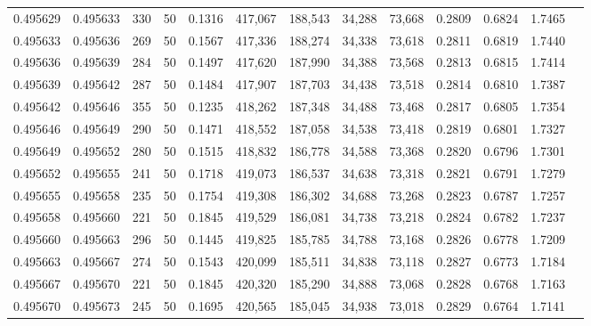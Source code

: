 \begin{tabular}{rrrrrrrrrrrrr}
0.495629 & 0.495633 &   330 &  50 &                                     0.1316 & 417,067 & 188,543 &  34,288 &  73,668 & 0.2809 & 0.6824 & 1.7465 \\
0.495633 & 0.495636 &   269 &  50 &                                     0.1567 & 417,336 & 188,274 &  34,338 &  73,618 & 0.2811 & 0.6819 & 1.7440 \\
0.495636 & 0.495639 &   284 &  50 &                                     0.1497 & 417,620 & 187,990 &  34,388 &  73,568 & 0.2813 & 0.6815 & 1.7414 \\
0.495639 & 0.495642 &   287 &  50 &                                     0.1484 & 417,907 & 187,703 &  34,438 &  73,518 & 0.2814 & 0.6810 & 1.7387 \\
0.495642 & 0.495646 &   355 &  50 &                                     0.1235 & 418,262 & 187,348 &  34,488 &  73,468 & 0.2817 & 0.6805 & 1.7354 \\
0.495646 & 0.495649 &   290 &  50 &                                     0.1471 & 418,552 & 187,058 &  34,538 &  73,418 & 0.2819 & 0.6801 & 1.7327 \\
0.495649 & 0.495652 &   280 &  50 &                                     0.1515 & 418,832 & 186,778 &  34,588 &  73,368 & 0.2820 & 0.6796 & 1.7301 \\
0.495652 & 0.495655 &   241 &  50 &                                     0.1718 & 419,073 & 186,537 &  34,638 &  73,318 & 0.2821 & 0.6791 & 1.7279 \\
0.495655 & 0.495658 &   235 &  50 &                                     0.1754 & 419,308 & 186,302 &  34,688 &  73,268 & 0.2823 & 0.6787 & 1.7257 \\
0.495658 & 0.495660 &   221 &  50 &                                     0.1845 & 419,529 & 186,081 &  34,738 &  73,218 & 0.2824 & 0.6782 & 1.7237 \\
0.495660 & 0.495663 &   296 &  50 &                                     0.1445 & 419,825 & 185,785 &  34,788 &  73,168 & 0.2826 & 0.6778 & 1.7209 \\
0.495663 & 0.495667 &   274 &  50 &                                     0.1543 & 420,099 & 185,511 &  34,838 &  73,118 & 0.2827 & 0.6773 & 1.7184 \\
0.495667 & 0.495670 &   221 &  50 &                                     0.1845 & 420,320 & 185,290 &  34,888 &  73,068 & 0.2828 & 0.6768 & 1.7163 \\
0.495670 & 0.495673 &   245 &  50 &                                     0.1695 & 420,565 & 185,045 &  34,938 &  73,018 & 0.2829 & 0.6764 & 1.7141 \\

\end{tabular}
